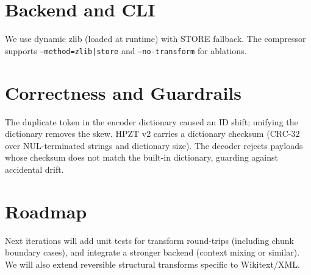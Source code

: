 \documentclass[11pt]{article}
\begin{document}
\section{Backend and CLI}
We use dynamic zlib (loaded at runtime) with STORE fallback. The compressor supports \texttt{--method=zlib|store} and \texttt{--no-transform} for ablations.

\section{Correctness and Guardrails}
The duplicate token in the encoder dictionary caused an ID shift; unifying the dictionary removes the skew. HPZT v2 carries a dictionary checksum (CRC-32 over NUL-terminated strings and dictionary size). The decoder rejects payloads whose checksum does not match the built-in dictionary, guarding against accidental drift.

\section{Roadmap}
Next iterations will add unit tests for transform round-trips (including chunk boundary cases), and integrate a stronger backend (context mixing or similar). We will also extend reversible structural transforms specific to Wikitext/XML.
\end{document}
